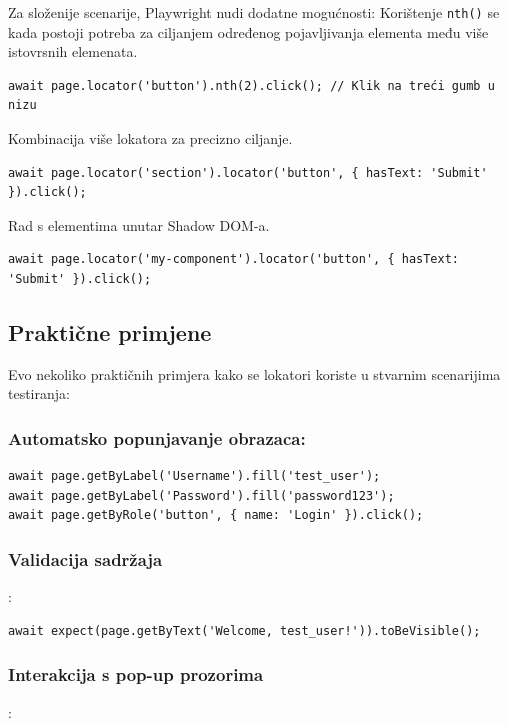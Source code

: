 Za složenije scenarije, Playwright nudi dodatne mogućnosti:
Korištenje \texttt{nth()} se kada postoji potreba za ciljanjem određenog pojavljivanja elementa među više istovrsnih elemenata.

\begin{verbatim}
await page.locator('button').nth(2).click(); // Klik na treći gumb u nizu
\end{verbatim}

Kombinacija više lokatora za precizno ciljanje.
\begin{verbatim}
await page.locator('section').locator('button', { hasText: 'Submit' }).click();
\end{verbatim}

Rad s elementima unutar Shadow DOM-a.
\begin{verbatim}
await page.locator('my-component').locator('button', { hasText: 'Submit' }).click();
\end{verbatim}

\subsection*{Praktične primjene}

Evo nekoliko praktičnih primjera kako se lokatori koriste u stvarnim scenarijima testiranja:

\subsubsection*{Automatsko popunjavanje obrazaca:}

\begin{verbatim}
await page.getByLabel('Username').fill('test_user');
await page.getByLabel('Password').fill('password123');
await page.getByRole('button', { name: 'Login' }).click();
\end{verbatim}

\subsubsection*{Validacija sadržaja}:

\begin{verbatim}
await expect(page.getByText('Welcome, test_user!')).toBeVisible();
\end{verbatim}

\subsubsection*{Interakcija s pop-up prozorima}:

